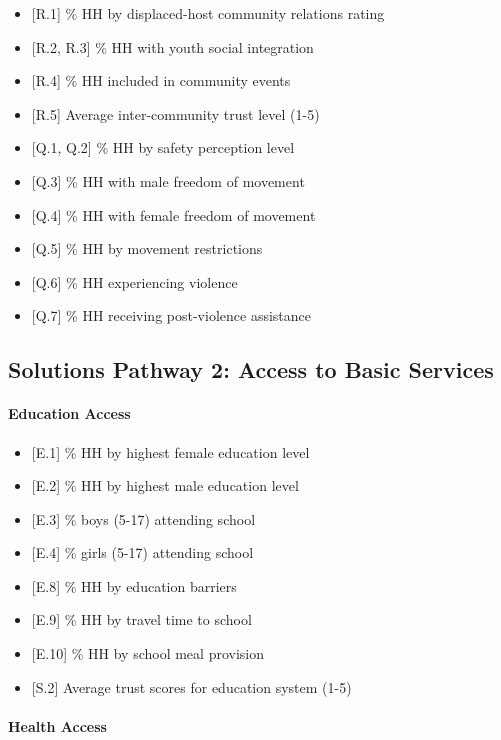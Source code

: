 \documentclass[
]{report}
\providecommand{\tightlist}{%
  \setlength{\itemsep}{0pt}\setlength{\parskip}{0pt}}
\begin{document}
\begin{itemize}
\tightlist
\item
  {[}R.1{]} \% HH by displaced-host community relations rating
\item
  {[}R.2, R.3{]} \% HH with youth social integration
\item
  {[}R.4{]} \% HH included in community events
\item
  {[}R.5{]} Average inter-community trust level (1-5)
\item
  {[}Q.1, Q.2{]} \% HH by safety perception level
\item
  {[}Q.3{]} \% HH with male freedom of movement
\item
  {[}Q.4{]} \% HH with female freedom of movement
\item
  {[}Q.5{]} \% HH by movement restrictions
\item
  {[}Q.6{]} \% HH experiencing violence
\item
  {[}Q.7{]} \% HH receiving post-violence assistance
\end{itemize}

\subsection{Solutions Pathway 2: Access to Basic
Services}\label{solutions-pathway-2-access-to-basic-services}

\paragraph{Education Access}\label{education-access}

\begin{itemize}
\tightlist
\item
  {[}E.1{]} \% HH by highest female education level
\item
  {[}E.2{]} \% HH by highest male education level
\item
  {[}E.3{]} \% boys (5-17) attending school
\item
  {[}E.4{]} \% girls (5-17) attending school
\item
  {[}E.8{]} \% HH by education barriers
\item
  {[}E.9{]} \% HH by travel time to school
\item
  {[}E.10{]} \% HH by school meal provision
\item
  {[}S.2{]} Average trust scores for education system (1-5)
\end{itemize}

\paragraph{Health Access}\label{health-access}
\end{document}
